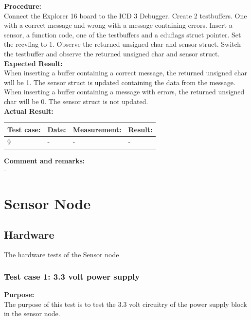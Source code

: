 \textbf{Procedure:}\\
Connect the Explorer 16 board to the ICD 3 Debugger. Create 2 testbuffers. One with a correct message and wrong with a message containing errors. Insert a sensor, a function code, one of the testbuffers and a cduflags struct pointer. Set the recvflag to 1. Observe the returned unsigned char and sensor struct. Switch the testbuffer and observe the returned unsigned char and sensor struct.\\

\textbf{Expected Result:}\\
When inserting a buffer containing a correct message, the returned unsigned char will be 1. The sensor struct is updated containing the data from the message.\\
When inserting a buffer containing a message with errors, the returned unsigned char will be 0. The sensor struct is not updated.\\

\textbf{Actual Result:}\\
\begin{table}[H]
\centering
\begin{tabular}{|p{2cm}|p{2cm}|p{3cm}|p{2cm}|}\hline
\textbf{Test case:} & \textbf{Date:} & \textbf{Measurement:} & \textbf{Result:} \\ \hline
9 & - & - & - \\ \hline
\end{tabular}
\end{table}

\textbf{Comment and remarks:}\\
-\\

\section{Sensor Node}
\subsection{Hardware}
The hardware tests of the Sensor node
\subsubsection{Test case 1: 3.3 volt power supply}
\textbf{Purpose:}\\
The purpose of this test is to test the 3.3 volt circuitry of the power supply block in the sensor node.\\

